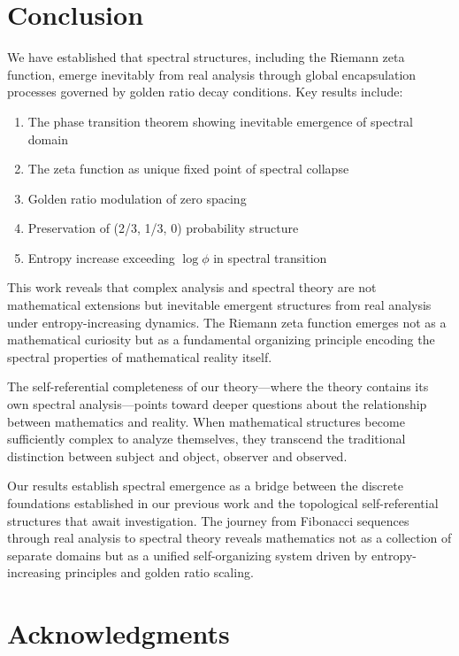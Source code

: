 \documentclass[12pt]{article}
\theoremstyle{plain}
\theoremstyle{definition}
\begin{document}
\section{Conclusion}

We have established that spectral structures, including the Riemann zeta function, emerge inevitably from real analysis through global encapsulation processes governed by golden ratio decay conditions. Key results include:

\begin{enumerate}
\item The phase transition theorem showing inevitable emergence of spectral domain
\item The zeta function as unique fixed point of spectral collapse
\item Golden ratio modulation of zero spacing
\item Preservation of (2/3, 1/3, 0) probability structure
\item Entropy increase exceeding $\log \phi$ in spectral transition
\end{enumerate}

This work reveals that complex analysis and spectral theory are not mathematical extensions but inevitable emergent structures from real analysis under entropy-increasing dynamics. The Riemann zeta function emerges not as a mathematical curiosity but as a fundamental organizing principle encoding the spectral properties of mathematical reality itself.

The self-referential completeness of our theory—where the theory contains its own spectral analysis—points toward deeper questions about the relationship between mathematics and reality. When mathematical structures become sufficiently complex to analyze themselves, they transcend the traditional distinction between subject and object, observer and observed.

Our results establish spectral emergence as a bridge between the discrete foundations established in our previous work and the topological self-referential structures that await investigation. The journey from Fibonacci sequences through real analysis to spectral theory reveals mathematics not as a collection of separate domains but as a unified self-organizing system driven by entropy-increasing principles and golden ratio scaling.

\section*{Acknowledgments}
\end{document}
